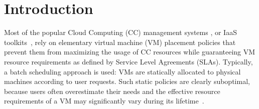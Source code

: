 \section{Introduction}
\label{sec:intro}

Most of the popular Cloud Computing (CC) management systems
\cite{cloudstack,opennebula,openstack}, or IaaS
toolkits~\cite{moreno:2012}, rely on elementary virtual machine (VM)
placement policies that prevent them from maximizing the usage
of CC resources while guaranteeing VM resource requirements as defined
by Service Level Agreements (SLAs).
Typically, a batch scheduling approach is used: VMs are statically
allocated to physical machines according to user requests. Such static
policies are clearly suboptimal, because users often overestimate
their needs and the effective resource requirements of a VM may
significantly vary during its lifetime~\cite{birke:nom2014}.

